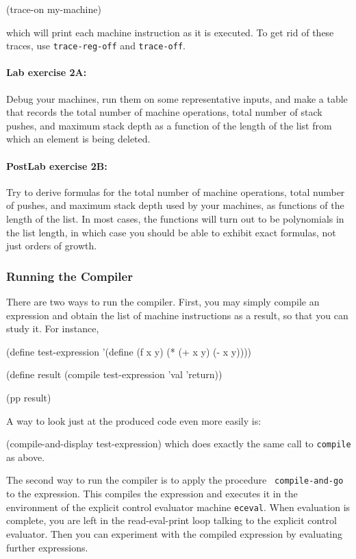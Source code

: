 \beginlisp
(trace-on my-machine)
\endlisp

which will print each machine instruction as it is executed.  To get rid
of these traces, use {\tt trace-reg-off} and {\tt trace-off}.

\paragraph{Lab exercise 2A:}
Debug your machines, run them on some representative inputs, and make a
table that records the total number of machine operations, total number of
stack pushes, and maximum stack depth as a function of the length of the
list from which an element is being deleted.

\paragraph{PostLab exercise 2B:}
Try to derive formulas for the total number of machine operations, total
number of pushes, and maximum stack depth used by your machines, as
functions of the length of the list.  In most cases, the functions will
turn out to be polynomials in the list length, in which case you should be
able to exhibit exact formulas, not just orders of growth.

\subsubsection{Running the Compiler}

There are two ways to run the compiler.  First, you may simply compile an
expression and obtain the list of machine instructions as a result, so
that you can study it.  For instance,

\beginlisp
(define test-expression '(define (f x y) (* (+ x y) (- x y))))

(define result (compile test-expression 'val 'return))

(pp result)
\endlisp

A way to look just at the produced code even more easily is:

\beginlisp
(compile-and-display test-expression)
\endlisp
which does exactly the same call to {\tt compile} as above.

The second way to run the compiler is to apply the procedure {\tt
compile-and-go} to the expression.  This compiles the expression and
executes it in the environment of the explicit control evaluator machine
{\tt eceval}.  When evaluation is complete, you are left in the
read-eval-print loop talking to the explicit control evaluator.  Then you
can experiment with the compiled expression by evaluating further
expressions.

